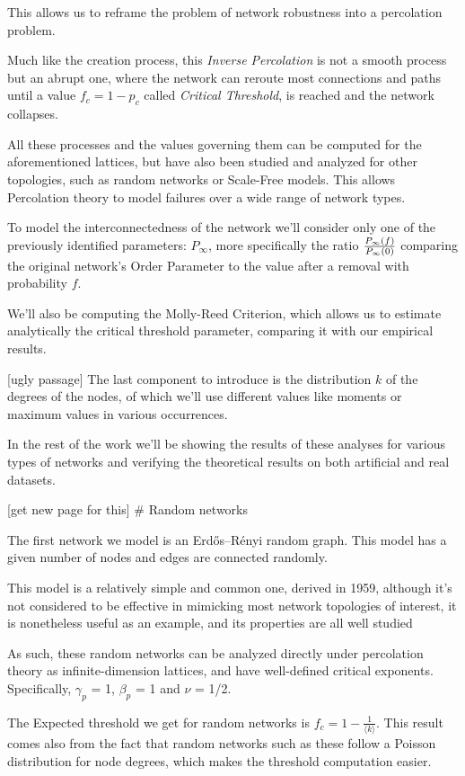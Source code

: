 \documentclass[
]{article}
\begin{document}
This allows us to reframe the problem of network robustness into a
percolation problem.

Much like the creation process, this \emph{Inverse Percolation} is not a
smooth process but an abrupt one, where the network can reroute most
connections and paths until a value \(f_c = 1-p_c\) called
\emph{Critical Threshold}, is reached and the network collapses.

All these processes and the values governing them can be computed for
the aforementioned lattices, but have also been studied and analyzed for
other topologies, such as random networks or Scale-Free models. This
allows Percolation theory to model failures over a wide range of network
types.

To model the interconnectedness of the network we'll consider only one
of the previously identified parameters: \(P_\infty\), more specifically
the ratio \(\Large \frac{P_{\infty}(f)}{P_{\infty}(0)}\) comparing the
original network's Order Parameter to the value after a removal with
probability \(f\).

We'll also be computing the Molly-Reed Criterion, which allows us to
estimate analytically the critical threshold parameter, comparing it
with our empirical results.

{[}ugly passage{]} The last component to introduce is the distribution
\(k\) of the degrees of the nodes, of which we'll use different values
like moments or maximum values in various occurrences.

In the rest of the work we'll be showing the results of these analyses
for various types of networks and verifying the theoretical results on
both artificial and real datasets.

{[}get new page for this{]} \# Random networks

The first network we model is an Erdős--Rényi random graph. This model
has a given number of nodes and edges are connected randomly.

This model is a relatively simple and common one, derived in 1959,
although it's not considered to be effective in mimicking most network
topologies of interest, it is nonetheless useful as an example, and its
properties are all well studied

As such, these random networks can be analyzed directly under
percolation theory as infinite-dimension lattices, and have well-defined
critical exponents. Specifically, \(\gamma_p\) = 1, \(\beta_p\) = 1 and
\(\nu\) = 1/2.

The Expected threshold we get for random networks is
\(f_c = 1-\frac{1}{ \langle k \rangle}\). This result comes also from
the fact that random networks such as these follow a Poisson
distribution for node degrees, which makes the threshold computation
easier.
\end{document}
